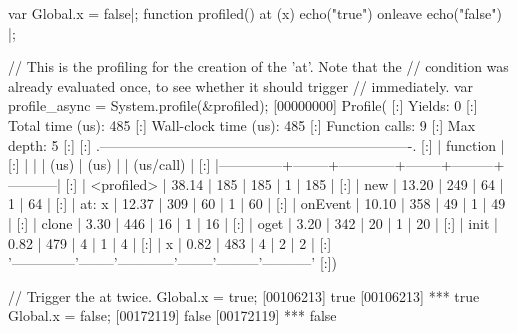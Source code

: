\begin{urbiscript}
var Global.x = false|;
function profiled()
{
  at (x)
    echo("true")
  onleave
    echo("false")
}|;

// This is the profiling for the creation of the 'at'. Note that the
// condition was already evaluated once, to see whether it should trigger
// immediately.
var profile_async = System.profile(&profiled);
[00000000] Profile(
[:]  Yields:                    0
[:]  Total time (us):         485
[:]  Wall-clock time (us):    485
[:]  Function calls:            9
[:]  Max depth:                 5
[:]
[:]  .-------------------------------------------------------------------.
[:]  |   function   |   %
[:]  |              |        |    (us)    |  (us)  |         | (us/call) |
[:]  |--------------+--------+------------+--------+---------+-----------|
[:]  |   <profiled> |  38.14 |        185 |    185 |       1 |       185 |
[:]  |          new |  13.20 |        249 |     64 |       1 |        64 |
[:]  |    at: { x } |  12.37 |        309 |     60 |       1 |        60 |
[:]  |      onEvent |  10.10 |        358 |     49 |       1 |        49 |
[:]  |        clone |   3.30 |        446 |     16 |       1 |        16 |
[:]  |         oget |   3.20 |        342 |     20 |       1 |        20 |
[:]  |         init |   0.82 |        479 |      4 |       1 |         4 |
[:]  |            x |   0.82 |        483 |      4 |       2 |         2 |
[:]  '--------------'--------'------------'--------'---------'-----------'
[:])

// Trigger the at twice.
Global.x = true;
[00106213] true
[00106213] *** true
Global.x = false;
[00172119] false
[00172119] *** false


\end{urbiscript}
